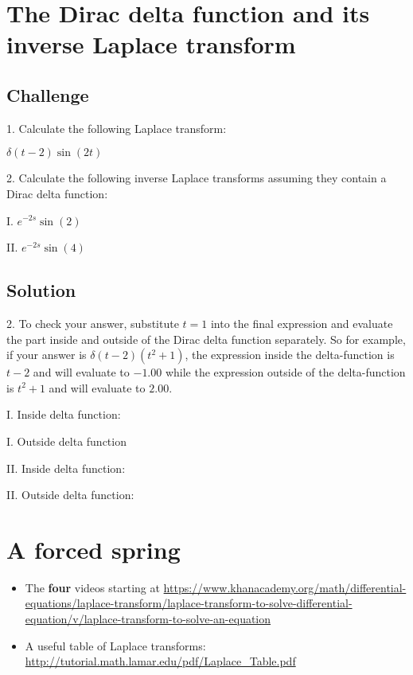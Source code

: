 \newpage
\section{The Dirac delta function and its inverse Laplace transform}

\subsection*{Challenge}
1. Calculate the following Laplace transform:

$\displaystyle \delta(t-2) \sin(2t)$

2. Calculate the following inverse Laplace transforms assuming they contain a Dirac delta function:

I. $\displaystyle e^{-2s} \sin(2)$

II. $\displaystyle e^{-2s} \sin(4)$

\subsection*{Solution}
2. To check your answer, substitute $t=1$ into the final expression and evaluate the part inside and outside of the Dirac delta function separately. So for example, if your answer is $\delta(t-2) (t^2+1)$, the expression inside the delta-function is $t-2$ and will evaluate to $-1.00$ while the expression outside of the delta-function is $t^2+1$ and will evaluate to $2.00$.

I. Inside delta function:\\

I. Outside delta function\\

II. Inside delta function:\\

II. Outside delta function:\\




\newpage
\section{A forced spring}

\begin{itemize}
    \item The \textbf{four} videos starting at \url{https://www.khanacademy.org/math/differential-equations/laplace-transform/laplace-transform-to-solve-differential-equation/v/laplace-transform-to-solve-an-equation}
    \item A useful table of Laplace transforms: \url{http://tutorial.math.lamar.edu/pdf/Laplace_Table.pdf}
\end{itemize}

